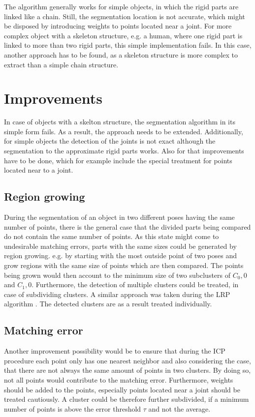 The algorithm generally works for simple objects, in which the rigid parts are linked like a chain. Still, the segmentation location is not accurate, which might be disposed by introducing weights to points located near a joint. For more complex object with a skeleton structure, e.g. a human, where one rigid part is linked to more than two rigid parts, this simple implementation fails. In this case, another approach has to be found, as a skeleton structure is more complex to extract than a simple chain structure.

\chapter{Improvements}

In case of objects with a skelton structure, the segmentation algorithm in its simple form fails. As a result, the approach needs to be extended. Additionally, for simple objects the detection of the joints is not exact although the segmentation to the approximate rigid parts works. Also for that improvements have to be done, which for example include the special treatment for points located near to a joint.

\section{Region growing}
During the segmentation of an object in two different poses having the same number of points, there is the general case that the divided parts being compared do not contain the same number of points. As this state might come to undesirable matching errors, parts with the same sizes could be generated by region growing. e.g. by starting with the most outside point of two poses and grow regions with the same size of points which are then compared. The points being grown would then account to the minimum size of two subclusters of $C_0,0$ and $C_1,0$. Furthermore, the detection of multiple clusters could be treated, in case of subdividing clusters. A similar approach was taken during the LRP algorithm \cite{guo2016correspondence}. The detected clusters are as a result treated individually.

\section{Matching error}
Another improvement possibility would be to ensure that during the ICP procedure each point only has one nearest neighbor and also considering the case, that there are not always the same amount of points in two clusters. By doing so, not all points would contribute to the matching error. Furthermore, weights should be added to the points, especially points located near a joint should be treated cautiously. A cluster could be therefore further subdivided, if a minimum number of points is above the error threshold $\tau$ and not the average. 



